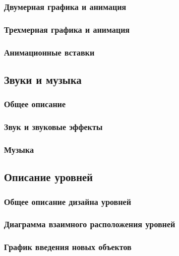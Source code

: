 \documentclass{article}
\begin{document}
\subsubsection{Двумерная графика и анимация}

\subsubsection{Трехмерная графика и анимация}

\subsubsection{Анимационные вставки}

\subsection{Звуки и музыка}

\subsubsection{Общее описание}

\subsubsection{Звук и звуковые эффекты}

\subsubsection{Музыка}

\subsection{Описание уровней}

\subsubsection{Общее описание дизайна уровней}

\subsubsection{Диаграмма взаимного расположения уровней}

\subsubsection{График введения новых объектов}
\end{document}
